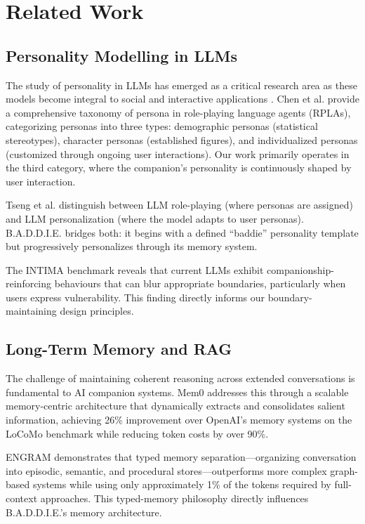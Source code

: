 \documentclass[sigconf]{acmart}
\begin{document}
\section{Related Work}

\subsection{Personality Modelling in LLMs}

The study of personality in LLMs has emerged as a critical research area as these models become integral to social and interactive applications \cite{findings2025personality}. Chen et al. \cite{chen2024tmlr-persona} provide a comprehensive taxonomy of persona in role-playing language agents (RPLAs), categorizing personas into three types: demographic personas (statistical stereotypes), character personas (established figures), and individualized personas (customized through ongoing user interactions). Our work primarily operates in the third category, where the companion's personality is continuously shaped by user interaction.

Tseng et al. \cite{tseng2024two} distinguish between LLM role-playing (where personas are assigned) and LLM personalization (where the model adapts to user personas). B.A.D.D.I.E. bridges both: it begins with a defined ``baddie'' personality template but progressively personalizes through its memory system.

The INTIMA benchmark \cite{arxiv2508.09998} reveals that current LLMs exhibit companionship-reinforcing behaviours that can blur appropriate boundaries, particularly when users express vulnerability. This finding directly informs our boundary-maintaining design principles.

\subsection{Long-Term Memory and RAG}

The challenge of maintaining coherent reasoning across extended conversations is fundamental to AI companion systems. Mem0 \cite{arxiv2504.19413} addresses this through a scalable memory-centric architecture that dynamically extracts and consolidates salient information, achieving 26\% improvement over OpenAI's memory systems on the LoCoMo benchmark while reducing token costs by over 90\%.

ENGRAM \cite{arxiv2511.12960} demonstrates that typed memory separation---organizing conversation into episodic, semantic, and procedural stores---outperforms more complex graph-based systems while using only approximately 1\% of the tokens required by full-context approaches. This typed-memory philosophy directly influences B.A.D.D.I.E.'s memory architecture.
\end{document}
